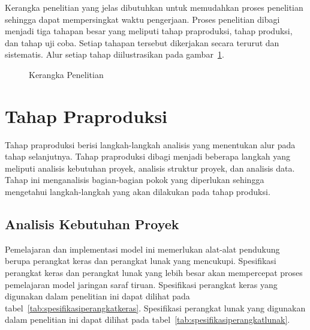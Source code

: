 Kerangka penelitian yang jelas dibutuhkan untuk memudahkan proses penelitian sehingga dapat
mempersingkat waktu pengerjaan. Proses penelitian dibagi menjadi tiga tahapan besar yang meliputi
tahap praproduksi, tahap produksi, dan tahap uji coba. Setiap tahapan tersebut dikerjakan secara
terurut dan sistematis. Alur setiap tahap diilustrasikan pada gambar~\ref{fig:kerangkapenelitian}.

\begin{figure}[htbp]
    \begin{center}
    \end{center}
    \vspace{-20pt}
    \captionsetup{labelfont=bf, textfont=bf}
    \caption{Kerangka Penelitian}
    \vspace{-10pt}
    \captionsetup{labelfont=md, textfont=md}
    \label{fig:kerangkapenelitian}
\end{figure}

\section{Tahap Praproduksi} \label{sec:3-TahapPraproduksi}

Tahap praproduksi berisi langkah-langkah analisis yang menentukan alur pada tahap selanjutnya. Tahap
praproduksi dibagi menjadi beberapa langkah yang meliputi analisis kebutuhan proyek, analisis
struktur proyek, dan analisis data. Tahap ini menganalisis bagian-bagian pokok yang diperlukan
sehingga mengetahui langkah-langkah yang akan dilakukan pada tahap produksi.

\subsection{Analisis Kebutuhan Proyek}

Pemelajaran dan implementasi model ini memerlukan alat-alat pendukung berupa perangkat keras dan
perangkat lunak yang mencukupi. Spesifikasi perangkat keras dan perangkat lunak yang lebih besar
akan mempercepat proses pemelajaran model jaringan saraf tiruan.
Spesifikasi perangkat keras yang digunakan dalam penelitian ini
dapat dilihat pada tabel~\ref{tab:spesifikasiperangkatkeras}. Spesifikasi perangkat lunak yang
digunakan dalam penelitian ini dapat dilihat pada tabel~\ref{tab:spesifikasiperangkatlunak}.


